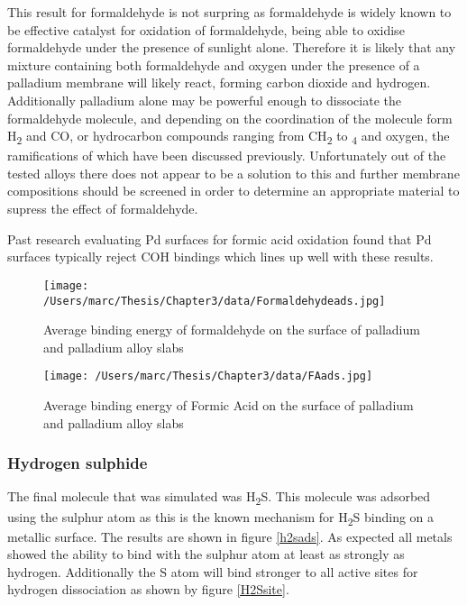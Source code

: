 This result for formaldehyde is not surpring as formaldehyde is widely known to be effective catalyst for oxidation of formaldehyde, being able to oxidise formaldehyde under the presence of sunlight alone. \cite{C6CY00062B} Therefore it is likely that any mixture containing both formaldehyde and oxygen under the presence of a palladium membrane will likely react, forming carbon dioxide and hydrogen. Additionally palladium alone may be powerful enough to dissociate the formaldehyde molecule, and depending on the coordination of the molecule form H\textsubscript{2} and CO, or hydrocarbon compounds ranging from CH\textsubscript{2} to \textsubscript{4} and oxygen,\cite{C8RA04983A} the ramifications of which have been discussed previously. Unfortunately out of the tested alloys there does not appear to be a solution to this and further membrane compositions should be screened in order to determine an appropriate material to supress the effect of formaldehyde.

Past research evaluating Pd surfaces for formic acid oxidation found that Pd surfaces typically reject COH bindings which lines up well with these results. \cite{CAPON1973239}




\begin{landscape}
  \begin{figure}
      \centering
      \texttt{[image: /Users/marc/Thesis/Chapter3/data/Formaldehydeads.jpg]}
      \caption{Average binding energy of formaldehyde on the surface of palladium and palladium alloy slabs}
      \label{formaldehydeads}
    \end{figure}
  
  \end{landscape}

\begin{landscape}
  \begin{figure}
      \centering
      \texttt{[image: /Users/marc/Thesis/Chapter3/data/FAads.jpg]}
      \caption{Average binding energy of Formic Acid on the surface of palladium and palladium alloy slabs}
      \label{FAads}
    \end{figure}
  
  \end{landscape}
\subsubsection{Hydrogen sulphide}
The final molecule that was simulated was H\textsubscript{2}S. This molecule was adsorbed using the sulphur atom as this is the known mechanism for H\textsubscript{2}S binding on a metallic surface. \cite{Morreale2007} The results are shown in figure \ref{h2sads}. As expected all metals showed the ability to bind with the sulphur atom at least as strongly as hydrogen. Additionally the S atom will bind stronger to all active sites for hydrogen dissociation as shown by figure \ref{H2Ssite}.

